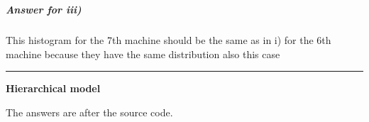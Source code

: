 \documentclass[11pt]{article}
\begin{document}
    \begin{center}
    \end{center}
    { \hspace*{\fill} \\}
    
    \hypertarget{answer-for-iii}{%
\subparagraph{Answer for iii)}\label{answer-for-iii}}

This histogram for the 7th machine should be the same as in i) for the
6th machine because they have the same distribution also this case

    \begin{center}\rule{0.5\linewidth}{\linethickness}\end{center}

\textbf{Hierarchical model}

    The answers are after the source code.
\end{document}
